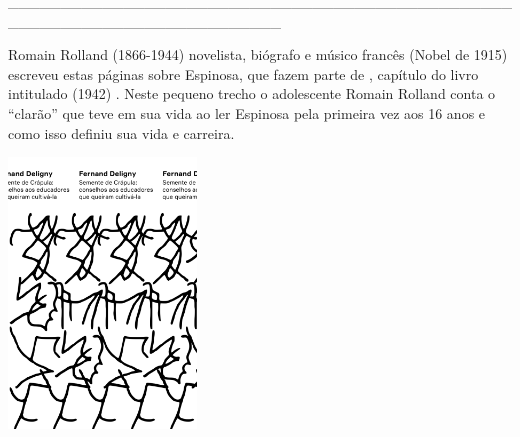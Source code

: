 {\hspace*{-2cm}\_\_\_\_\_\_\_\_\_\_\_\_\_\_\_\_\_\_\_\_\_\_\_\_\_\_\_\_\_\_\_\_\_\_\_\_\_\_\_\_\_\_\_\_\_\_\_\_\_\_\_\_\_\_\_\_\_\_\_\_\_\_\_\_\_\_\_\_\_\_\_\_\_\_

\medskip

\noindent{}Romain Rolland (1866-1944) novelista, biógrafo e músico francês (Nobel de 1915) escreveu estas páginas sobre Espinosa, que fazem parte de {}, capítulo do livro intitulado {} (1942) . Neste pequeno trecho o adolescente Romain Rolland conta o “clarão” que teve em sua vida ao ler Espinosa pela primeira vez aos 16 anos e como isso definiu sua vida e carreira.

\vfill

\hspace*{-.4cm}\begin{minipage}[c]{0.90\linewidth}
\small{
{}}
\end{minipage}

\pagebreak

\hspace{.5cm}

\begin{center}
\hspace*{-2.5cm}
\hspace*{1.5cm}\includegraphics[width=50mm]{./imgs/deligny.png}
\end{center}

}
